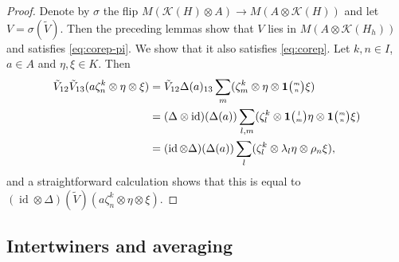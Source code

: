 \documentclass[11pt]{article}
\DeclareMathOperator{\id}{id}
\newcommand{\Grt}[3]{#1{\tiny {\begin{pmatrix} #2\\#3\end{pmatrix}}}}
\newcommand{\UnitC}[2]{\Grt{\mathbf{1}}{#1}{#2}}
\theoremstyle{definition}
\numberwithin{equation}{section}
\begin{document}
 \begin{proof}
   Denote by $\sigma$ the flip $ M(\mathcal{K}(H) \otimes A) \to M(A
   \otimes \mathcal{K}(H))$ and let $V=\sigma(\tilde V)$. Then the
   preceding lemmas show that $V$ lies in $M(A\otimes
   \mathcal{K}(H_{h}))$ and satisfies \eqref{eq:corep-pi}. We show
   that it also satisfies \eqref{eq:corep}. Let $k,n\in I$, $a\in A$ and $\eta,\xi \in K$. Then
 \begin{align*}
\tilde V_{12}\tilde V_{13}(a\zeta^{k}_{n} \otimes \eta\otimes \xi) &=
\tilde V_{12} \Delta(a)_{13}\sum_{m}(\zeta^{k}_{m} \otimes \eta \otimes \UnitC{m}{n}\xi) \\
&= (\Delta \otimes \id)(\Delta(a)) \sum_{l,m} (\zeta^{k}_{l} \otimes \UnitC{l}{m}\eta \otimes
\UnitC{m}{n}\xi)  \\
&= (\id \otimes \Delta)(\Delta(a))  \sum_{l} (\zeta^{k}_{l} \otimes \lambda_{l}\eta \otimes
\rho_{n}\xi),
\end{align*}
and a straightforward calculation shows that this is equal to $(\id \otimes \Delta)(\tilde
V)(a\zeta^{k}_{n} \otimes \eta\otimes \xi)$.
 \end{proof}

\subsection{Intertwiners and averaging}
\end{document}
